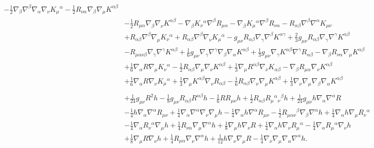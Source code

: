 \documentclass[10pt,letterpaper]{article}
\begin{document}
\begin{align}
 -  \tfrac{1}{2} \nabla_{\beta}\nabla^{\beta}\nabla_{\alpha}\nabla_{\nu}K_{\mu}{}^{\alpha}
 -  \tfrac{1}{2} R_{\nu \alpha} \nabla_{\beta}\nabla_{\mu}K^{\alpha \beta}\nonumber\\
& -  \tfrac{1}{2} R_{\mu \alpha} \nabla_{\beta}\nabla_{\nu}K^{\alpha \beta}
 -  \nabla_{\beta}K_{\nu}{}^{\alpha} \nabla^{\beta}R_{\mu \alpha}
 -  \nabla_{\beta}K_{\mu}{}^{\alpha} \nabla^{\beta}R_{\nu \alpha}
 -  R_{\alpha \beta} \nabla^{\beta}\nabla^{\alpha}K_{\mu \nu}\nonumber\\
& + R_{\alpha \beta} \nabla^{\beta}\nabla_{\mu}K_{\nu}{}^{\alpha}
 + R_{\alpha \beta} \nabla^{\beta}\nabla_{\nu}K_{\mu}{}^{\alpha}
 -  g_{\mu \nu} R_{\alpha \beta} \nabla_{\gamma}\nabla^{\beta}K^{\alpha \gamma}
 + \tfrac{2}{3} g_{\mu \nu} R_{\alpha \beta} \nabla_{\gamma}\nabla^{\gamma}K^{\alpha \beta}\nonumber\\
& -  R_{\mu \alpha \nu \beta} \nabla_{\gamma}\nabla^{\gamma}K^{\alpha \beta}
 + \tfrac{1}{6} g_{\mu \nu} \nabla_{\gamma}\nabla^{\gamma}\nabla_{\beta}\nabla_{\alpha}K^{\alpha \beta}
 + \tfrac{1}{3} g_{\mu \nu} \nabla_{\gamma}K^{\alpha \beta} \nabla^{\gamma}R_{\alpha \beta}
 -  \nabla_{\beta}R_{\nu \alpha} \nabla_{\mu}K^{\alpha \beta}\nonumber\\
& + \tfrac{1}{6} \nabla_{\alpha}R \nabla_{\mu}K_{\nu}{}^{\alpha}
 -  \tfrac{1}{2} R_{\alpha \beta} \nabla_{\mu}\nabla_{\nu}K^{\alpha \beta}
 + \tfrac{1}{3} \nabla_{\mu}R^{\alpha \beta} \nabla_{\nu}K_{\alpha \beta}
 -  \nabla_{\beta}R_{\mu \alpha} \nabla_{\nu}K^{\alpha \beta}\nonumber\\
& + \tfrac{1}{6} \nabla_{\alpha}R \nabla_{\nu}K_{\mu}{}^{\alpha}
 + \tfrac{1}{3} \nabla_{\mu}K^{\alpha \beta} \nabla_{\nu}R_{\alpha \beta}
 -  \tfrac{1}{6} R_{\alpha \beta} \nabla_{\nu}\nabla_{\mu}K^{\alpha \beta}
 + \tfrac{1}{3} \nabla_{\nu}\nabla_{\mu}\nabla_{\beta}\nabla_{\alpha}K^{\alpha \beta}\nonumber \\
\nonumber \\
&+\tfrac{1}{24} g_{\mu \nu} R^2 h
 -  \tfrac{1}{8} g_{\mu \nu} R_{\alpha \beta} R^{\alpha \beta} h
 -  \tfrac{1}{6} R R_{\mu \nu} h
 + \tfrac{1}{2} R_{\alpha \beta} R_{\mu}{}^{\alpha}{}_{\nu}{}^{\beta} h
 + \tfrac{1}{24} g_{\mu \nu} h \nabla_{\alpha}\nabla^{\alpha}R\nonumber\\
& -  \tfrac{1}{4} h \nabla_{\alpha}\nabla^{\alpha}R_{\mu \nu}
 + \tfrac{1}{4} \nabla_{\alpha}\nabla^{\alpha}\nabla_{\nu}\nabla_{\mu}h
 -  \tfrac{1}{4} \nabla_{\alpha}h \nabla^{\alpha}R_{\mu \nu}
 -  \tfrac{1}{2} R_{\mu \alpha \nu}{}^{\beta} \nabla_{\beta}\nabla^{\alpha}h
 + \tfrac{1}{4} \nabla_{\alpha}h \nabla_{\mu}R_{\nu}{}^{\alpha}\nonumber\\
& -  \tfrac{1}{4} \nabla_{\alpha}R_{\nu}{}^{\alpha} \nabla_{\mu}h
 + \tfrac{1}{4} R_{\nu \alpha} \nabla_{\mu}\nabla^{\alpha}h
 + \tfrac{1}{8} \nabla_{\mu}h \nabla_{\nu}R
 + \tfrac{1}{4} \nabla_{\alpha}h \nabla_{\nu}R_{\mu}{}^{\alpha}
 -  \tfrac{1}{4} \nabla_{\alpha}R_{\mu}{}^{\alpha} \nabla_{\nu}h\nonumber\\
& + \tfrac{1}{8} \nabla_{\mu}R \nabla_{\nu}h
 + \tfrac{1}{4} R_{\mu \alpha} \nabla_{\nu}\nabla^{\alpha}h
 + \tfrac{1}{12} h \nabla_{\nu}\nabla_{\mu}R
 -  \tfrac{1}{4} \nabla_{\nu}\nabla_{\mu}\nabla_{\alpha}\nabla^{\alpha}h.
\end{align}
\end{document}
